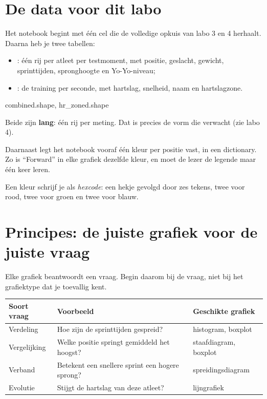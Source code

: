 \documentclass[11pt,a4paper]{article}
\begin{document}
\section{De data voor dit labo}

Het notebook begint met één cel die de volledige opkuis van labo 3 en 4
herhaalt. Daarna heb je twee tabellen:

\begin{itemize}
  \item {}: één rij per atleet per testmoment, met positie,
        geslacht, gewicht, sprinttijden, spronghoogte en Yo-Yo-niveau;
  \item {}: de training per seconde, met hartslag,
        snelheid, naam en hartslagzone.
\end{itemize}

\begin{python}
combined.shape, hr_zoned.shape
\end{python}

Beide zijn \textbf{lang}: één rij per meting. Dat is precies de vorm die
 verwacht (zie labo 4).

Daarnaast legt het notebook vooraf één kleur per positie vast, in een
dictionary. Zo is ``Forward'' in elke grafiek dezelfde kleur, en moet de
lezer de legende maar één keer leren.


Een kleur schrijf je als \emph{hexcode}: een hekje gevolgd door zes
tekens, twee voor rood, twee voor groen en twee voor blauw.

\section{Principes: de juiste grafiek voor de juiste vraag}

Elke grafiek beantwoordt een vraag. Begin daarom bij de vraag, niet bij
het grafiektype dat je toevallig kent.

\begin{center}
\begin{tabularx}{\textwidth}{@{}L{2.8cm}Y L{3.3cm}@{}}
\toprule
\textbf{Soort vraag} & \textbf{Voorbeeld} & \textbf{Geschikte grafiek} \\
\midrule
Verdeling & Hoe zijn de sprinttijden gespreid? & histogram, boxplot \\
Vergelijking & Welke positie springt gemiddeld het hoogst? & staafdiagram, boxplot \\
Verband & Betekent een snellere sprint een hogere sprong? & spreidingsdiagram \\
Evolutie & Stijgt de hartslag van deze atleet? & lijngrafiek \\
\bottomrule
\end{tabularx}
\end{center}
\end{document}
